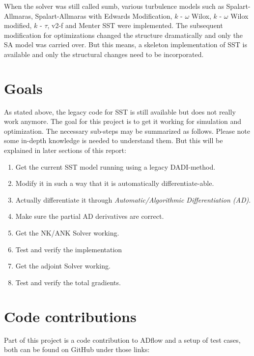 When the solver was still called sumb, various turbulence models such as
Spalart-Allmaras, Spalart-Allmaras with Edwards Modification, $k$ - $\omega$
Wilox, $k$ - $\omega$ Wilox modified, $k$ - $\tau$, v2-f and Menter SST were
implemented. The subsequent modification for optimizations changed the
structure dramatically and only the SA model was carried over. But this means,
a skeleton implementation of SST is available and only the structural changes
need to be incorporated.


\section{Goals}
\label{sec:goals}
As stated above, the legacy code for SST is still available but does not really
work anymore. The goal for this project is to get it working for simulation and
optimization. The necessary sub-steps may be summarized as follows. Please note
some in-depth knowledge is needed to understand them. But this will be
explained in later sections of this report:

\begin{enumerate}
    \item Get the current SST model running using a legacy DADI-method.

    \item Modify it in such a way that it is automatically differentiate-able.

    \item Actually differentiate it through \textit{Automatic/Algorithmic
        Differentiation (AD)}.

    \item Make sure the partial AD derivatives are correct. 

    \item Get the NK/ANK Solver working.

    \item Test and verify the implementation

    \item Get the adjoint Solver working.

    \item Test and verify the total gradients.
\end{enumerate}








\section{Code contributions}
Part of this project is a code contribution to ADflow and a setup of test
cases, both can be found on GitHub under those links:\\

